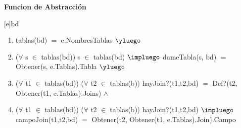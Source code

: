 \begin{Representacion}
\textbf{Funcion de Abstracci\'on}

[e]{bd}{
\begin{enumerate}
	\item tablas(bd) $=$ e.NombresTablas $\yluego$ 
    \item ($\forall$ s $\in$ tablas(bd)) s $\in$ tablas(bd) $\impluego$ dameTabla(s, bd) $=$ Obtener(s, e.Tablas).Tabla $\yluego$ 
    \item ($\forall$ t1 $\in$ tablas(bd)) ($\forall$ t2 $\in$ tablas(b)) hayJoin?(t1,t2,bd) $=$ Def?(t2, Obtener(t1, e.Tablas).Joins) $\land$ 
    \item ($\forall$ t1 $\in$ tablas(bd)) ($\forall$ t2 $\in$ tablas(b)) hayJoin?(t1,t2,bd) $\impluego$ campoJoin(t1,t2,bd) $=$ Obtener(t2, Obtener(t1, e.Tablas).Join).Campo   
    \end{enumerate}
}
    
\end{Representacion}  

